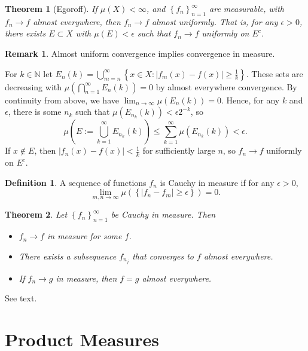 \documentclass[11pt]{article}
\newtheorem{thm}{Theorem}[section]
\theoremstyle{definition}
\newtheorem{defn}{Definition}[section]
\newtheorem{remark}{Remark}[section]
\newcommand{\set}[1]{\left\{ #1 \right\}}
\newcommand{\abs}[1]{\left\lvert#1\right\rvert} %
\newcommand{\NN}{\mathbb{N}}
\begin{document}
\begin{thm}[Egoroff]
  If $\mu(X)<\infty$, and $\set{f_n}_{n=1}^\infty$ are measurable, with $f_n\to f$ almost
  everywhere, then $f_n\to f$ almost uniformly. That is, for any $\epsilon>0$, there exists
  $E\subset X$ with $\mu(E)<\epsilon$ such that $f_n\to f$ uniformly on $E^c$.
\end{thm}
\begin{remark}
  Almost uniform convergence implies convergence in measure.
\end{remark}
\proof
  For $k\in\NN$ let $E_n(k)=\bigcup_{m=n}^\infty\set{x\in X:\abs{f_m(x)-f(x)}\ge\frac1k}$.
  These sets are decreasing with $\mu\left(\bigcap_{n=1}^\infty E_n(k)\right)=0$ by almost
  everywhere convergence. By continuity from above, we have
  $\lim_{n\to\infty}\mu(E_n(k))=0$. Hence, for any $k$ and $\epsilon$, there is some $n_k$
  such that $\mu(E_{n_k}(k))<\epsilon2^{-k}$, so
  \[
    \mu\left(E:=\bigcup_{k=1}^\infty E_{n_k}(k)\right) \le \sum_{k=1}^\infty\mu(E_{n_k}(k))
    < \epsilon .
  \]
  If $x\notin E$, then $\abs{f_n(x)-f(x)}<\frac1k$ for sufficiently large $n$, so $f_n\to
  f$ uniformly on $E^c$.
\qedhere

\begin{defn}
  A sequence of functions $f_n$ is Cauchy in measure if for any $\epsilon>0$,
  \[
    \lim_{m,n\to\infty}\mu(\set{\abs{f_n-f_m}\ge\epsilon})=0 .
  \]
\end{defn}

\begin{thm}
  Let $\set{f_n}_{n=1}^\infty$ be Cauchy in measure. Then 
  \begin{itemize}
    \item $f_n\to f$ in measure for some $f$. 
    \item There exists a subsequence $f_{n_j}$ that converges to $f$ almost everywhere. 
    \item If $f_n\to g$ in measure, then $f=g$ almost everywhere. 
  \end{itemize}
\end{thm}
\proof See text. \qedhere





\section{Product Measures}
\end{document}
